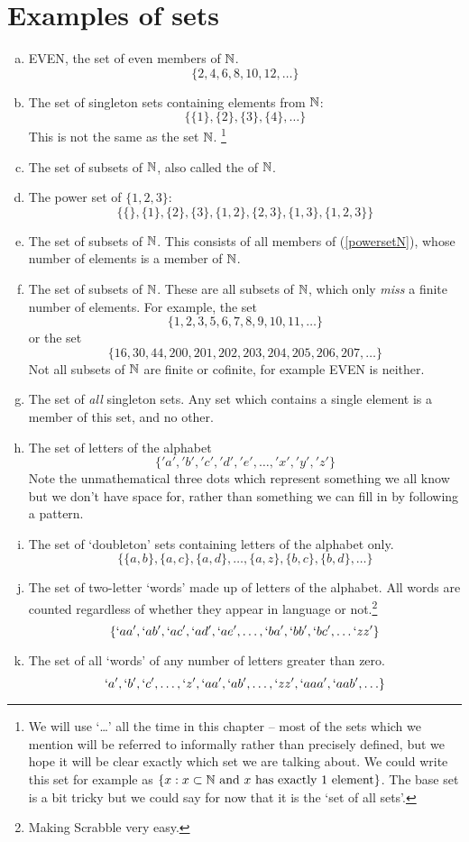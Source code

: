 \chapter{Examples of sets}
\label{examples}

\begin{enumerate}[(a)]
\item
{\sc EVEN}, the set of even members of $\mathbb{N}$.
\[ \{2, 4, 6, 8, 10, 12, \ldots \} \]
\item
The set of singleton sets containing elements from $\mathbb{N}$:
\[ \{\{1\}, \{2\}, \{3\}, \{4\}, \ldots \} \]
This is not the same as the set $\mathbb{N}$.
\footnote{We will use `\ldots' all the time in this chapter -- most of the sets which we mention will be referred to informally rather than precisely defined, but we hope it will be clear exactly which set we are talking about. We could write this set for example as $\{ x : x \subset \mathbb{N} \text{ and } x \text{ has exactly 1 element} \}$. The base set is a bit tricky but we could say for now that it is the `set of all sets'.} 
\item\label{powersetN}
The set of subsets of $\mathbb{N}$, also called the  of $\mathbb{N}$.
\item
The power set of $\{1, 2, 3\}$:
\[ \{\{\}, \{1\}, \{2\}, \{3\}, \{1,2\}, \{2,3\}, \{1, 3\}, \{1,2,3\} \}\]
\item
The set of  subsets of $\mathbb{N}$. This consists of all members of (\ref{powersetN}), whose number of elements is a member of $\mathbb{N}$.
\item
The set of  subsets of $\mathbb{N}$. These are all subsets of $\mathbb{N}$, which only \emph{miss} a finite number of elements. For example, the set
\[ \{ 1, 2, 3, 5, 6, 7, 8, 9, 10, 11, \ldots \} \]
or the set 
\[ \{ 16, 30, 44, 200, 201, 202, 203, 204, 205, 206, 207, \ldots \} \]
Not all subsets of $\mathbb{N}$ are finite or cofinite, for example {\sc EVEN} is neither.
\item
The set of \emph{all} singleton sets. Any set which contains a single element is a member of this set, and no other.
\item
The set of letters of the alphabet
\[ \{'a', 'b', 'c', 'd', 'e', \ldots, 'x', 'y', 'z' \} \]
Note the unmathematical three dots which represent something we all know but we don't have space for, rather than something we can fill in by following a pattern.
\item
The set of `doubleton' sets containing letters of the alphabet only.
\[ \{ \{a, b\}, \{a,c\}, \{a,d\}, \ldots, \{a, z\}, \{b,c\}, \{b,d\}, \ldots \} \]
\item
The set of two-letter `words' made up of letters of the alphabet. All words are counted regardless of whether they appear in language or not.\footnote{Making Scrabble very easy.}
\[ \{ `aa', `ab', `ac', `ad', `ae', \ldots, `ba', `bb', `bc', \ldots `zz' \}\]
\item
The set of all `words' of any number of letters greater than zero.
\[ `a', `b', `c', \ldots, `z', `aa', `ab', \ldots, `zz', `aaa', `aab', \ldots \}\]
\end{enumerate} 
